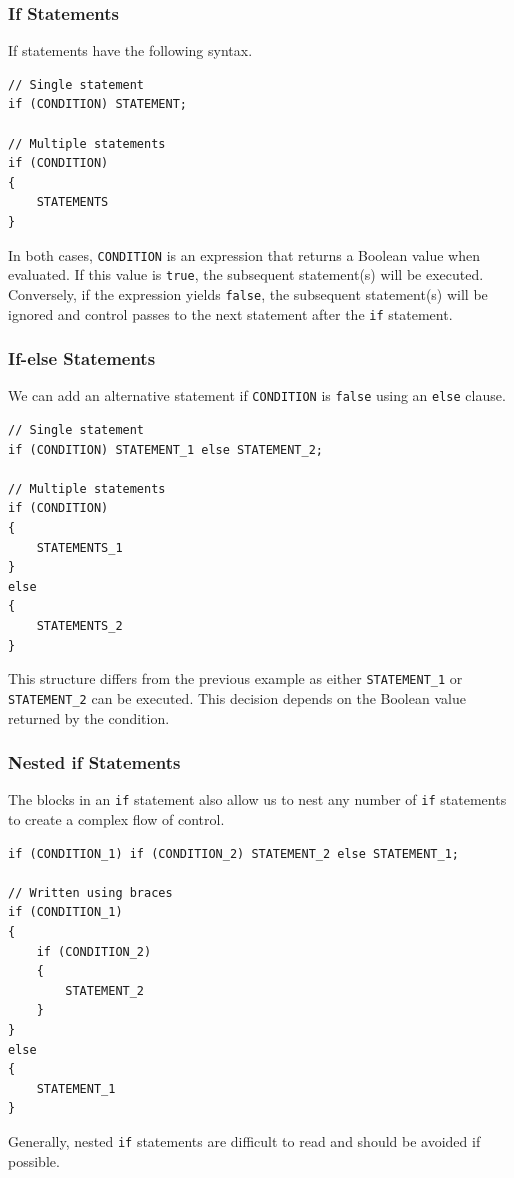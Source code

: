 \documentclass{article}
\begin{document}
\subsubsection{If Statements}
If statements have the following syntax.
\begin{verbatim}
// Single statement
if (CONDITION) STATEMENT;

// Multiple statements
if (CONDITION)
{
    STATEMENTS
}
\end{verbatim}
In both cases, \texttt{CONDITION} is an expression that
returns a Boolean value when evaluated. If this value is
\texttt{true}, the subsequent statement(s) will be
executed. Conversely, if the expression yields
\texttt{false}, the subsequent statement(s) will be ignored
and control passes to the next statement after the
\texttt{if} statement.%
\subsubsection{If-else Statements}
We can add an alternative statement if \texttt{CONDITION}
is \texttt{false} using an \texttt{else}
clause.%
\begin{verbatim}
// Single statement
if (CONDITION) STATEMENT_1 else STATEMENT_2;

// Multiple statements
if (CONDITION)
{
    STATEMENTS_1
}
else
{
    STATEMENTS_2
}
\end{verbatim}
This structure differs from the previous example as either
\texttt{STATEMENT_1} or \texttt{STATEMENT_2}
can be executed. This decision depends on the Boolean value returned by
the condition.
\subsubsection{Nested if Statements}
The blocks in an \texttt{if} statement also allow us to
nest any number of \texttt{if} statements to create a
complex flow of control.
\begin{verbatim}
if (CONDITION_1) if (CONDITION_2) STATEMENT_2 else STATEMENT_1;

// Written using braces
if (CONDITION_1)
{
    if (CONDITION_2)
    {
        STATEMENT_2
    }
}
else
{
    STATEMENT_1
}
\end{verbatim}
Generally, nested \texttt{if} statements are difficult to
read and should be avoided if possible.
\end{document}
